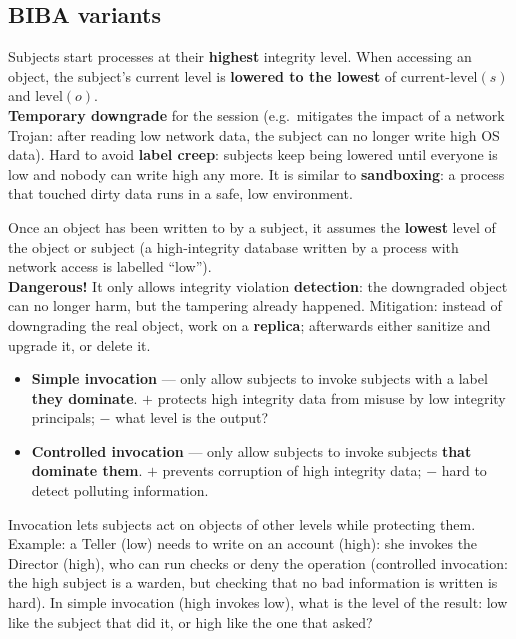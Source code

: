 \subsection{BIBA variants}

\begin{defnbox}[title=Variant 1 --- low-water-mark for subjects]
Subjects start processes at their \textbf{highest} integrity level. When accessing an
object, the subject's current level is \textbf{lowered to the lowest} of
$\text{current-level}(s)$ and $\text{level}(o)$. \\
\textbf{Temporary downgrade} for the session (e.g.\ mitigates the impact of a network
Trojan: after reading low network data, the subject can no longer write high OS data).
Hard to avoid \textbf{label creep}: subjects keep being lowered until everyone is
low and nobody can write high any more. It is similar to \textbf{sandboxing}: a process that
touched dirty data runs in a safe, low environment.
\end{defnbox}

\begin{defnbox}[title=Variant 2 --- low-water-mark for objects]
Once an object has been written to by a subject, it assumes the \textbf{lowest} level of
the object or subject (a high-integrity database written by a process with network
access is labelled ``low''). \\
\textbf{Dangerous!} It only allows integrity violation \textbf{detection}: the downgraded
object can no longer harm, but the tampering already happened. Mitigation: instead of
downgrading the real object, work on a \textbf{replica}; afterwards either sanitize and upgrade
it, or delete it.
\end{defnbox}

\begin{defnbox}[title=Invocation]
\begin{itemize}
  \item \textbf{Simple invocation} --- only allow subjects to invoke subjects with a label
        \textbf{they dominate}. $+$ protects high integrity data from misuse by low
        integrity principals; $-$ what level is the output?
  \item \textbf{Controlled invocation} --- only allow subjects to invoke subjects
        \textbf{that dominate them}. $+$ prevents corruption of high integrity data;
        $-$ hard to detect polluting information.
\end{itemize}
Invocation lets subjects act on objects of other levels while protecting them. Example: a Teller
(low) needs to write on an account (high): she invokes the Director (high), who can run checks or
deny the operation (controlled invocation: the high subject is a warden, but checking that no bad
information is written is hard). In simple invocation (high invokes low), what is the level of
the result: low like the subject that did it, or high like the one that asked?
\end{defnbox}

